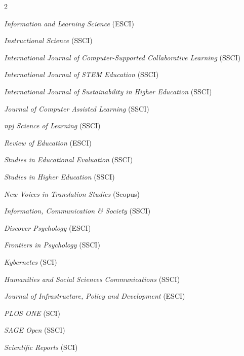 \documentclass[11pt,a4paper]{article}
\newcommand{\listitemspace}{0.14em}
\renewenvironment{itemize}
{
  \begin{list}{}{\setlength{\leftmargin}{0em}
      \setlength{\parskip}{0em}
      \setlength{\itemsep}{\listitemspace}
      \setlength{\parsep}{\listitemspace}}}
  {
\end{list}}
\begin{document}
\begin{multicols}{2}
\begin{itemize}
  \item \textit{Information and Learning Science} {\footnotesize\color{black!65}(ESCI)}
  \item \textit{Instructional Science} {\footnotesize\color{black!65}(SSCI)}
  \item \textit{International Journal of Computer-Supported Collaborative Learning} {\footnotesize\color{black!65}(SSCI)}
  \item \textit{International Journal of STEM Education} {\footnotesize\color{black!65}(SSCI)}
  \item \textit{International Journal of Sustainability in Higher Education} {\footnotesize\color{black!65}(SSCI)}
  \item \textit{Journal of Computer Assisted Learning} {\footnotesize\color{black!65}(SSCI)}
  \item \textit{npj Science of Learning} {\footnotesize\color{black!65}(SSCI)}
  \item \textit{Review of Education} {\footnotesize\color{black!65}(ESCI)}
  \item \textit{Studies in Educational Evaluation} {\footnotesize\color{black!65}(SSCI)}
  \item \textit{Studies in Higher Education} {\footnotesize\color{black!65}(SSCI)}
  \item \textit{New Voices in Translation Studies} {\footnotesize\color{black!65}(Scopus)}
  \item \textit{Information, Communication \& Society} {\footnotesize\color{black!65}(SSCI)}
  \item \textit{Discover Psychology} {\footnotesize\color{black!65}(ESCI)}
  \item \textit{Frontiers in Psychology} {\footnotesize\color{black!65}(SSCI)}
  \item \textit{Kybernetes} {\footnotesize\color{black!65}(SCI)}
  \item \textit{Humanities and Social Sciences Communications} {\footnotesize\color{black!65}(SSCI)}
  \item \textit{Journal of Infrastructure, Policy and Development} {\footnotesize\color{black!65}(ESCI)}
  \item \textit{PLOS ONE} {\footnotesize\color{black!65}(SCI)}
  \item \textit{SAGE Open} {\footnotesize\color{black!65}(SSCI)}
  \item \textit{Scientific Reports} {\footnotesize\color{black!65}(SCI)}
\end{itemize}
\end{multicols}
\end{document}
